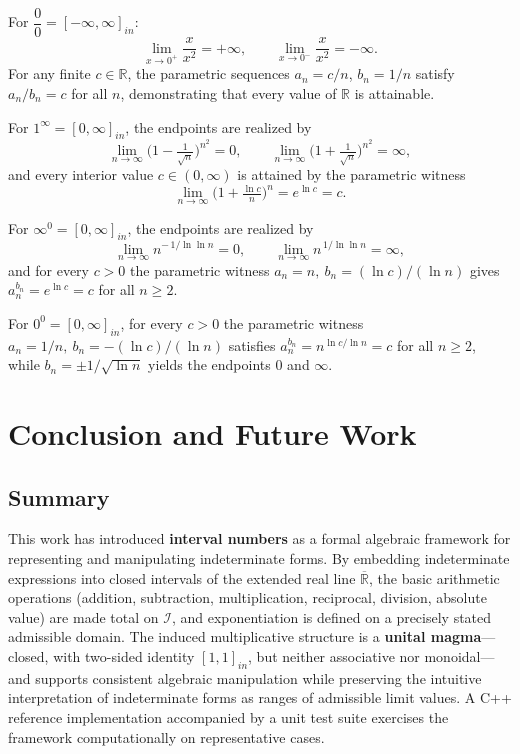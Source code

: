 \documentclass[11pt,a4paper]{article}
\theoremstyle{paperdef}
\newcommand{\Rext}{\overline{\mathbb{R}}}
\newcommand{\Iset}{\mathcal{I}}
\newcommand{\inI}[1]{[#1]_{in}}
\begin{document}
For $\dfrac{0}{0} = \inI{-\infty, \infty}$:
\[
\lim_{x \to 0^{+}}\frac{x}{x^{2}} = +\infty, \qquad
\lim_{x \to 0^{-}}\frac{x}{x^{2}} = -\infty.
\]
For any finite $c \in \mathbb{R}$, the parametric sequences
$a_n = c/n$, $b_n = 1/n$ satisfy $a_n/b_n = c$ for all $n$,
demonstrating that every value of $\mathbb{R}$ is attainable.

For $1^\infty = \inI{0, \infty}$, the endpoints are realized by
\[
\lim_{n \to \infty}\Big(1 - \tfrac{1}{\sqrt{n}}\Big)^{n^2} = 0,
\qquad
\lim_{n \to \infty}\Big(1 + \tfrac{1}{\sqrt{n}}\Big)^{n^2} = \infty,
\]
and every interior value $c \in (0, \infty)$ is attained by the
parametric witness
\[
\lim_{n \to \infty}\Big(1 + \tfrac{\ln c}{n}\Big)^{n} = e^{\ln c} = c.
\]

For $\infty^0 = \inI{0, \infty}$, the endpoints are realized by
\[
\lim_{n \to \infty} n^{-\,1/\ln\ln n} = 0, \qquad
\lim_{n \to \infty} n^{\,1/\ln\ln n} = \infty,
\]
and for every $c > 0$ the parametric witness
$a_n = n,\ b_n = (\ln c)/(\ln n)$ gives
$a_n^{b_n} = e^{\ln c} = c$ for all $n \ge 2$.

For $0^0 = \inI{0, \infty}$, for every $c > 0$ the parametric witness
$a_n = 1/n,\ b_n = -(\ln c)/(\ln n)$ satisfies
$a_n^{b_n} = n^{\ln c / \ln n} = c$ for all $n \ge 2$, while
$b_n = \pm 1/\sqrt{\ln n}$ yields the endpoints $0$ and $\infty$.

\section{Conclusion and Future Work}\label{sec:conclusion}

\subsection{Summary}

This work has introduced \textbf{interval numbers} as a formal
algebraic framework for representing and manipulating indeterminate
forms. By embedding indeterminate expressions into closed intervals of
the extended real line $\Rext$, the basic arithmetic operations
(addition, subtraction, multiplication, reciprocal, division,
absolute value) are made total on $\Iset$, and exponentiation is
defined on a precisely stated admissible domain. The induced
multiplicative structure is a \textbf{unital magma}---closed, with
two-sided identity $\inI{1,1}$, but neither associative nor
monoidal---and supports consistent algebraic manipulation while
preserving the intuitive interpretation of indeterminate forms as
ranges of admissible limit values. A C++ reference implementation
accompanied by a unit test suite exercises the framework
computationally on representative cases.
\end{document}
